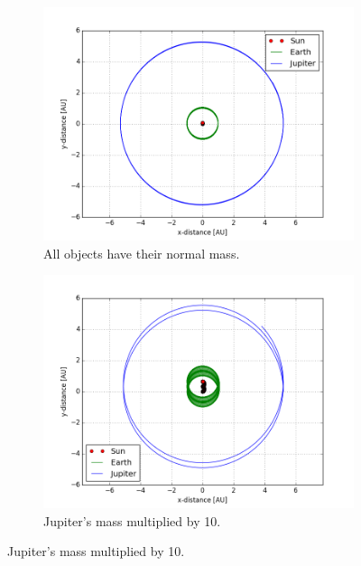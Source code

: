 \documentclass[10pt,showpacs,preprintnumbers,footinbib,amsmath,amssymb,aps,prl,twocolumn,groupedaddress,superscriptaddress,showkeys]{revtex4-1}
\begin{document}
\begin{figure}
	\centering
	\begin{subfigure}[b]{0.4\textwidth}
		\includegraphics[width=\textwidth]{earth_sun_jupiter_verlet_25yr_dt0_00001_MJ1.png}
		\caption{All objects have their normal mass.}
		\label{fig:e_s_j_dt0_00001_m1}
	\end{subfigure}
	
	
    \begin{subfigure}[b]{0.4\textwidth}
		\includegraphics[width=\textwidth]{earth_sun_jupiter_verlet_25yr_dt0_00001_MJ10.png}
		\caption{Jupiter's mass multiplied by 10.}
		\label{fig:e_s_j_dt0_00001_m10}
	\end{subfigure}
	

\end{figure}
\end{document}
